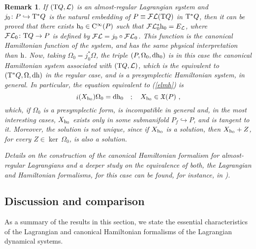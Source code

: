 \documentclass[12pt]{report}
\newtheorem{remark}[teor]{Remark}
\def\vf{\mathfrak X}
\def\Lag{{\cal L}}
\def\d{{\rm d}}
\def\Tan{{\rm T}}
\def\inn{\mathop{i}\nolimits}
\def\Cinfty{{\rm C}^\infty}
\def\Leg{{\cal F}\Lag}
\begin{document}
\begin{remark}{\rm 
If $(\Tan Q,\Lag)$ is an almost-regular Lagrangian system
and $j_0\colon P\hookrightarrow\Tan^*Q$ is the 
natural embedding of $P\equiv\Leg(\Tan Q)$ in $\Tan^*Q$,
then it can be proved that there exists ${\rm h}_0\in\Cinfty (P)$
such that $\Leg_0^*{\rm h}_0=E_\Lag$, where
$\Leg_0\colon\Tan Q\to P$ is defined by $\Leg=j_0\circ\Leg_0$.
This function is the {\sl canonical Hamiltonian function} of the system,
and has the same physical interpretation than ${\rm h}$.
Now, taking $\Omega_0=j_0^*\Omega$, the triple
$(P,\Omega_0,\d{\rm h}_0)$ is in this case the {\sl canonical Hamiltonian system}
associated with $(\Tan Q,\Lag)$, which is the equivalent to $(\Tan^*Q,\Omega,\d{\rm h})$ in the regular case, and is a presymplectic Hamiltonian system, in general.
In particular, the equation equivalent to (\ref{elmh}) is
$$
\inn (X_{{\rm h}_0})\Omega_0= \d {\rm h}_0 \quad ;\quad X_{{\rm h}_0}\in\vf(P) \ ,
$$
which, if $\Omega_0$ is a presymplectic form,
is incompatible in general and,  in the most interesting cases, $X_{{\rm h}_0}$ exists only in
some submanifold $P_f\hookrightarrow P$, and is tangent to it.
Moreover, the solution is not unique, since if $X_{{\rm h}_0}$ is a solution, then
$X_{{\rm h}_0}+Z$, for every $Z\in\ker\,\Omega_0$, is also a solution.

Details on the construction of the canonical Hamiltonian formalism for
almost-regular Lagrangians and a deeper study on the equivalence of
both, the Lagrangian and Hamiltonian formalisms, for this case
can be found, for instance, in
\cite{BGPR-86,CL-87,CLR-87,CLR-88,GN-79,GP-89,Ka-82,SR-83}).
}\end{remark}


\subsection{Discussion and comparison}


As a summary of the results in this section,
we state the essential characteristics of  the Lagrangian and canonical Hamiltonian
 formalisms of  the Lagrangian dynamical systems.
\end{document}
